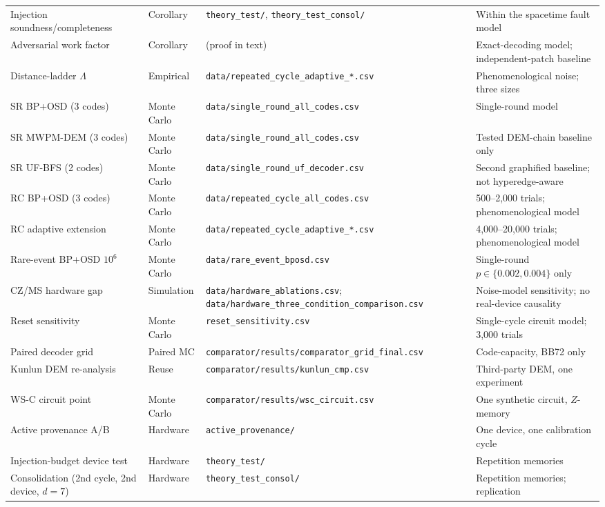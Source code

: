 \documentclass[11pt,a4paper]{article}
\begin{document}
\begin{table}[H]
\begin{tabularx}{\textwidth}{@{}p{3.1cm}p{1.7cm}X p{2.9cm}@{}}
Injection soundness/completeness & Corollary & \texttt{theory\_test/}, \texttt{theory\_test\_consol/} & Within the spacetime fault model \\
Adversarial work factor & Corollary & (proof in text) & Exact-decoding model; independent-patch baseline \\
Distance-ladder $\Lambda$ & Empirical & \texttt{data/repeated\_cycle\_adaptive\_*.csv} & Phenomenological noise; three sizes \\
SR BP+OSD (3 codes) & Monte Carlo & \texttt{data/single\_round\_all\_codes.csv} & Single-round model \\
SR MWPM-DEM (3 codes) & Monte Carlo & \texttt{data/single\_round\_all\_codes.csv} & Tested DEM-chain baseline only \\
SR UF-BFS (2 codes) & Monte Carlo & \texttt{data/single\_round\_uf\_decoder.csv} & Second graphified baseline; not hyperedge-aware \\
RC BP+OSD (3 codes) & Monte Carlo & \texttt{data/repeated\_cycle\_all\_codes.csv} & 500--2,000 trials; phenomenological model \\
RC adaptive extension & Monte Carlo & \texttt{data/repeated\_cycle\_adaptive\_*.csv} & 4,000--20,000 trials; phenomenological model \\
Rare-event BP+OSD $10^{6}$ & Monte Carlo & \texttt{data/rare\_event\_bposd.csv} & Single-round $p\in\{0.002,0.004\}$ only \\
CZ/MS hardware gap & Simulation & \texttt{data/hardware\_ablations.csv}; \texttt{data/hardware\_three\_condition\_comparison.csv} & Noise-model sensitivity; no real-device causality \\
Reset sensitivity & Monte Carlo & \texttt{reset\_sensitivity.csv} & Single-cycle circuit model; 3,000 trials \\
Paired decoder grid & Paired MC & \texttt{comparator/results/comparator\_grid\_final.csv} & Code-capacity, BB72 only \\
Kunlun DEM re-analysis & Reuse & \texttt{comparator/results/kunlun\_cmp.csv} & Third-party DEM, one experiment \\
WS-C circuit point & Monte Carlo & \texttt{comparator/results/wsc\_circuit.csv} & One synthetic circuit, $Z$-memory \\
Active provenance A/B & Hardware & \texttt{active\_provenance/} & One device, one calibration cycle \\
Injection-budget device test & Hardware & \texttt{theory\_test/} & Repetition memories \\
Consolidation (2nd cycle, 2nd device, $d{=}7$) & Hardware & \texttt{theory\_test\_consol/} & Repetition memories; replication \\
\bottomrule
\end{tabularx}
\end{table}
\end{document}
